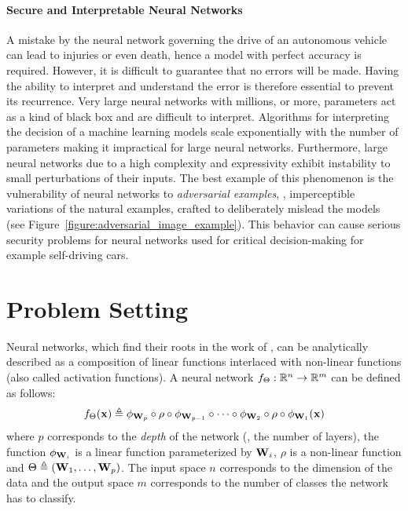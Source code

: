\paragraph{Secure and Interpretable Neural Networks}
A mistake by the neural network governing the drive of an autonomous vehicle can lead to injuries or even death, hence a model with perfect accuracy is required.
However, it is difficult to guarantee that no errors will be made.
Having the ability to interpret and understand the error is therefore essential to prevent its recurrence.
Very large neural networks with millions, or more, parameters act as a kind of black box and are difficult to interpret.
Algorithms \cite{lundberg2017unified} for interpreting the decision of a machine learning models scale exponentially with the number of parameters making it impractical for large neural networks. 
Furthermore, large neural networks due to a high complexity and expressivity exhibit instability to small perturbations of their inputs.
The best example of this phenomenon is the vulnerability of neural networks to \emph{adversarial examples}, \ie, imperceptible variations of the natural examples, crafted to deliberately mislead the models~\cite{globerson2006nightmare,biggio2013evasion,Szegedy2013IntriguingPO} (see Figure~\ref{figure:adversarial_image_example}). 
This behavior can cause serious security problems for neural networks used for critical decision-making for example self-driving cars.


\section{Problem Setting}
\label{section:ch1-problem_setting}

Neural networks, which find their roots in the work of \citet{mcculloch1943logical,rosenblatt1958perceptron}, can be analytically described as a composition of linear functions interlaced with non-linear functions (also called activation functions).
A neural network $f_\Theta : \mathbb{R}^n \rightarrow \mathbb{R}^m$ can be defined as follows:
\begin{equation}
  f_\Theta(\mathbf{x}) \triangleq \phi_{\mathbf{W}_p} \circ \rho \circ \phi_{\mathbf{W}_{p-1}} \circ \cdots \circ \phi_{\mathbf{W}_2} \circ \rho \circ \phi_{\mathbf{W}_1}(\mathbf{x})
  \label{equation:neural_network}
\end{equation}
where $p$ corresponds to the \emph{depth} of the network (\ie, the number of layers), the function $\phi_{\mathbf{W}_i}$ is a linear function parameterized by $\mathbf{W}_i$, $\rho$ is a non-linear function and $\Theta \triangleq ( \mathbf{W}_1, \dots, \mathbf{W}_p )$.
The input space $n$ corresponds to the dimension of the data and the output space $m$ corresponds to the number of classes the network has to classify.

